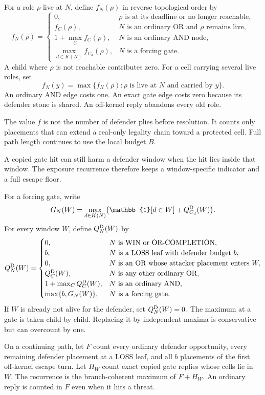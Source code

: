 \begin{definition}
\label{def:D20}
For a role $\rho$ live at $N$, define $f_N(\rho)$ in reverse topological
order by
\[
f_N(\rho)=
\begin{cases}
0,&\rho\text{ is at its deadline or no longer reachable},\\
f_C(\rho),&N\text{ is an ordinary OR and }\rho\text{ remains live},\\
1+\max_C f_C(\rho),&N\text{ is an ordinary AND node},\\
\max_{d\in K(N)}f_{C_d}(\rho),&N\text{ is a forcing gate}.
\end{cases}
\]
A child where $\rho$ is not reachable contributes zero.  For a cell carrying
several live roles, set
\[
f_N(y)=\max\{f_N(\rho):\rho\text{ is live at }N\text{ and carried by }y\}.
\]
An ordinary AND edge costs one.  An exact gate edge costs zero because its
defender stone is shared.  An off-kernel reply abandons every old role.
\end{definition}

\begin{plainterms}
The value $f$ is not the number of defender plies before resolution.  It
counts only placements that can extend a real-only legality chain toward a
protected cell.  Full path length continues to use the local budget $B$.
\end{plainterms}

A copied gate hit can still harm a defender window when the hit lies inside
that window.  The exposure recurrence therefore keeps a window-specific
indicator and a full escape floor.

\begin{definition}
\label{def:D20a}
For a forcing gate, write
\[
G_N(W)=\max_{d\in K(N)}
  \bigl(\mathbb{1}[d\in W]+Q_{C_d}^\D(W)\bigr).
\]
For every window $W$, define $Q_N^{\mathrm{D}}(W)$ by
\[
Q_N^{\mathrm{D}}(W)=
\begin{cases}
0,&N\text{ is WIN or OR-COMPLETION},\\
b,&N\text{ is a LOSS leaf with defender budget }b,\\
0,&N\text{ is an OR whose attacker placement enters }W,\\
Q_C^{\mathrm{D}}(W),&N\text{ is any other ordinary OR},\\
1+\max_C Q_C^{\mathrm{D}}(W),&N\text{ is an ordinary AND},\\
\max\{b,G_N(W)\},&N\text{ is a forcing gate}.
\end{cases}
\]
If $W$ is already not alive for the defender, set $Q_N^{\mathrm{D}}(W)=0$.  The
maximum at a gate is taken child by child.  Replacing it by independent
maxima is conservative but can overcount by one.

On a continuing path, let $F$ count every ordinary defender opportunity,
every remaining defender placement at a LOSS leaf, and all $b$ placements of
the first off-kernel escape turn.  Let $H_W$ count exact copied gate replies
whose cells lie in $W$.  The recurrence is the branch-coherent maximum of
$F+H_W$.  An ordinary reply is counted in $F$ even when it hits a threat.
\end{definition}

